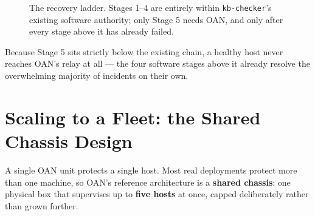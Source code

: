 \documentclass[11pt,a4paper]{article}
\newcommand{\figcap}[1]{\caption{#1}}
\begin{document}
\begin{figure}[h!]
\centering
{}
\figcap{The recovery ladder. Stages 1--4 are entirely within \texttt{kb-checker}'s existing software authority; only Stage 5 needs OAN, and only after every stage above it has already failed.}
\label{fig:ladder}
\end{figure}

Because Stage 5 sits strictly below the existing chain, a healthy host
never reaches OAN's relay at all --- the four software stages above it
already resolve the overwhelming majority of incidents on their own.

\section{Scaling to a Fleet: the Shared Chassis Design}
\label{sec:scaling}

A single OAN unit protects a single host. Most real deployments protect
more than one machine, so OAN's reference architecture is a
\textbf{shared chassis}: one physical box that supervises up to
\textbf{five hosts} at once, capped deliberately rather than grown
further.
\end{document}
